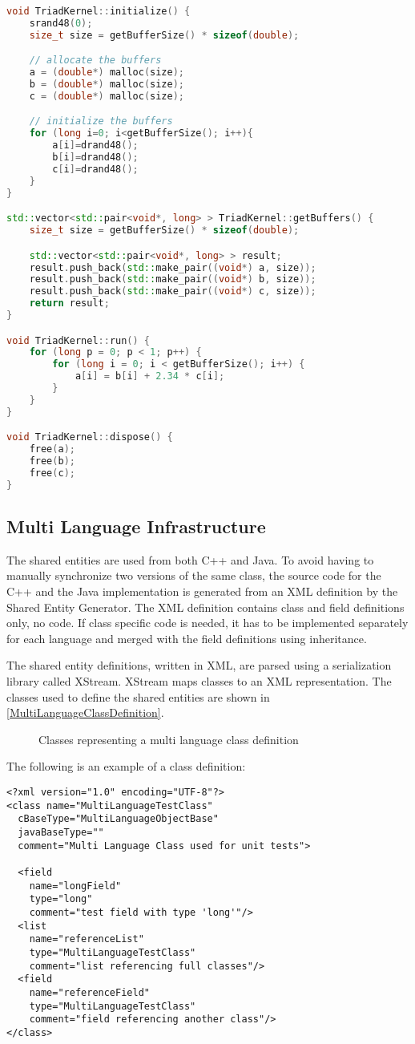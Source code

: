 \documentclass[a4paper,12pt]{article}
\newlength{\imgwidth}
\newcommand{\umlDiagram}[1]{%
	\settowidth{\imgwidth}{\texttt{[image: out/diagrams/\#1.pdf]}}%
	\setlength{\imgwidth}{\minof{0.5\imgwidth}{\textwidth}}%
	\par\vskip0.5cm\noindent\makebox[\textwidth][c]{%
	\texttt{[image: out/diagrams/\#1.pdf]}%
}\vskip0.5cm}
\newcommand{\umlFloat}[2]{
\begin{figure}[htbp]
\umlDiagram{#1}
\caption{#2}
\label{#1}
\end{figure}
}
\newcommand{\umlRef}[1]{\autoref{#1}}
\begin{document}
\begin{lstlisting}[language=C++]
void TriadKernel::initialize() {
	srand48(0);
	size_t size = getBufferSize() * sizeof(double);

	// allocate the buffers
	a = (double*) malloc(size);
	b = (double*) malloc(size);
	c = (double*) malloc(size);

	// initialize the buffers
	for (long i=0; i<getBufferSize(); i++){
		a[i]=drand48();
		b[i]=drand48();
		c[i]=drand48();
	}
}

std::vector<std::pair<void*, long> > TriadKernel::getBuffers() {
	size_t size = getBufferSize() * sizeof(double);

	std::vector<std::pair<void*, long> > result;
	result.push_back(std::make_pair((void*) a, size));
	result.push_back(std::make_pair((void*) b, size));
	result.push_back(std::make_pair((void*) c, size));
	return result;
}

void TriadKernel::run() {
	for (long p = 0; p < 1; p++) {
		for (long i = 0; i < getBufferSize(); i++) {
			a[i] = b[i] + 2.34 * c[i];
		}
	}
}

void TriadKernel::dispose() {
	free(a);
	free(b);
	free(c);
}

\end{lstlisting}

\subsection{Multi Language Infrastructure}
\label{sec:MultiLanguageInfrastructure}
The shared entities are used from both C++ and Java. To avoid having to
manually synchronize two versions of the same class, the source code for the C++
and the Java implementation is generated from an XML definition by the Shared
Entity Generator. The XML definition contains class and field definitions only,
no code. If class specific code is needed, it has to be implemented separately for each language and merged with the field definitions using
inheritance.

The shared entity definitions, written in XML, are parsed using a
serialization library called XStream. XStream maps classes to an XML
representation. The classes used to define the shared entities are shown
in \umlRef{MultiLanguageClassDefinition}.

\umlFloat{MultiLanguageClassDefinition}{Classes representing a multi language
class definition}

The following is an example of a class definition:
\begin{verbatim}
<?xml version="1.0" encoding="UTF-8"?>
<class name="MultiLanguageTestClass" 
  cBaseType="MultiLanguageObjectBase"
  javaBaseType=""
  comment="Multi Language Class used for unit tests">

  <field 
    name="longField" 
    type="long" 
    comment="test field with type 'long'"/>
  <list  
    name="referenceList" 
    type="MultiLanguageTestClass" 
    comment="list referencing full classes"/>
  <field 
    name="referenceField" 
    type="MultiLanguageTestClass" 
    comment="field referencing another class"/>
</class>
\end{verbatim}
\end{document}
